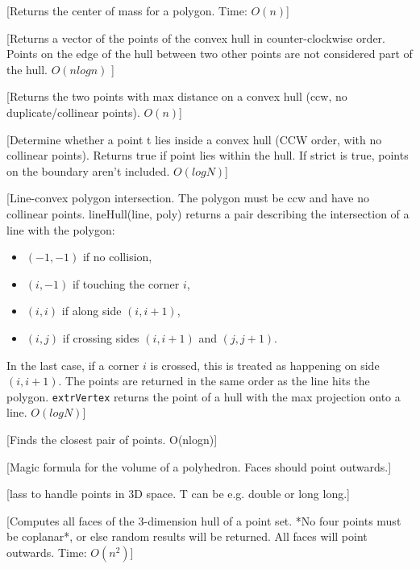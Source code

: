 [Returns the center of mass for a polygon. Time: $O(n)$]

[Returns a vector of the points of the convex hull in counter-clockwise order.
Points on the edge of the hull between two other points are not considered part of the hull. $O(nlogn)$
]

[Returns the two points with max distance on a convex hull (ccw, no duplicate/collinear points). $O(n)$]

[Determine whether a point t lies inside a convex hull (CCW
 order, with no collinear points). Returns true if point lies within
 the hull. If strict is true, points on the boundary aren't included. $O(logN)$]

[Line-convex polygon intersection. The polygon must be ccw and have no collinear points.
 lineHull(line, poly) returns a pair describing the intersection of a line with the polygon:
  \begin{itemize}
    \item $(-1, -1)$ if no collision,
    \item $(i, -1)$ if touching the corner $i$,
    \item $(i, i)$ if along side $(i, i+1)$,
    \item $(i, j)$ if crossing sides $(i, i+1)$ and $(j, j+1)$.
  \end{itemize}
  In the last case, if a corner $i$ is crossed, this is treated as happening on side $(i, i+1)$.
  The points are returned in the same order as the line hits the polygon.
 \texttt{extrVertex} returns the point of a hull with the max projection onto a line. $O(logN)$]

[Finds the closest pair of points. O(nlogn)]

[Magic formula for the volume of a polyhedron. Faces should point outwards.]

[lass to handle points in 3D space.	T can be e.g. double or long long.]

[Computes all faces of the 3-dimension hull of a point set. *No four points must be coplanar*, or else random results will be returned. All faces will point outwards. Time: $O(n^2)$]


